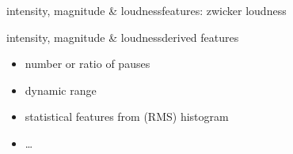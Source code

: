 \begin{frame}{intensity, magnitude \& loudness}{features: zwicker loudness}
{\begin{itemize}
            \end{itemize}
            }
        \end{frame}

        \begin{frame}{intensity, magnitude \& loudness}{derived features}
            \begin{itemize}
                \item   number or ratio of pauses
                \item   dynamic range
                \item   statistical features from (RMS) histogram
                \item   \ldots
            \end{itemize}
        \end{frame}
                


